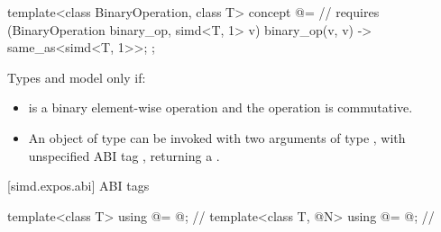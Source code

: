 \begin{itemdecl}
template<class BinaryOperation, class T>
  concept @\reductionoperation@ =  // \expos
    requires (BinaryOperation binary_op, simd<T, 1> v) {
      { binary_op(v, v) } -> same_as<simd<T, 1>>;
    };
\end{itemdecl}
\begin{itemdescr}
\pnum
Types  and  model 
only if:
\begin{itemize}
  \item {} is a binary element-wise operation and the operation is commutative.

  \item An object of type  can be invoked with two arguments of type
    , with unspecified ABI tag , returning a .
\end{itemize}
\end{itemdescr}

[simd.expos.abi]{ ABI tags}

\begin{itemdecl}
template<class T> using @\nativeabi@ = @\seebelow@; // \expos
template<class T, @\simdsizetype@ N> using @\deducet@ = @\seebelow@; // \expos
\end{itemdecl}

